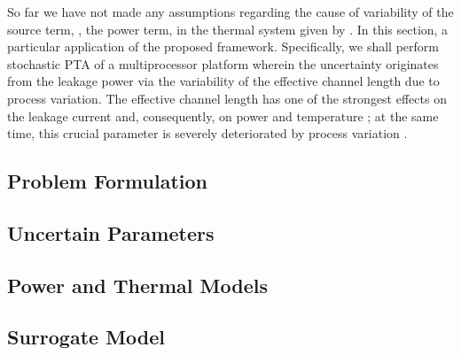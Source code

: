 So far we have not made any assumptions regarding the cause of variability of the source term, \ie, the power term, in the thermal system given by .
In this section, a particular application of the proposed framework.
Specifically, we shall perform stochastic PTA of a multiprocessor platform wherein the uncertainty originates from the leakage power via the variability of the effective channel length due to process variation.
The effective channel length has one of the strongest effects on the leakage current and, consequently, on power and temperature \cite{juan2011, juan2012}; at the same time, this crucial parameter is severely deteriorated by process variation \cite{chandrakasan2001, srivastava2010}.

\subsection{Problem Formulation} 


\subsection{Uncertain Parameters} 


\subsection{Power and Thermal Models}  


\subsection{Surrogate Model} 

